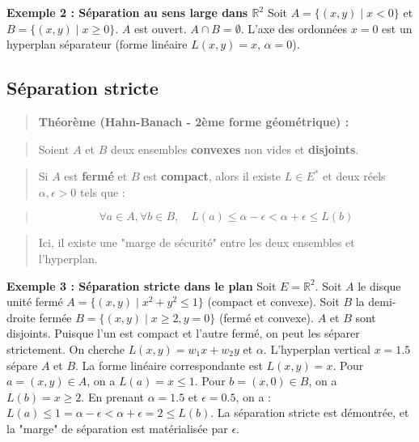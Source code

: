 \documentclass[11pt,a4paper]{article}
\begin{document}
\textbf{Exemple 2 : Séparation au sens large dans $\mathbb{R}^2$}
Soit $A = \{ (x,y) \mid x < 0 \}$ et $B = \{ (x,y) \mid x \ge 0 \}$. $A$ est ouvert. $A \cap B = \emptyset$. L'axe des ordonnées $x=0$ est un hyperplan séparateur (forme linéaire $L(x,y)=x$, $\alpha=0$).


\begin{center}
\end{center}


\subsection{Séparation stricte}

\begin{quote}\textbf{Théorème (Hahn-Banach - 2ème forme géométrique) :}\end{quote}
\begin{quote}Soient $A$ et $B$ deux ensembles \textbf{convexes} non vides et \textbf{disjoints}.\end{quote}
\begin{quote}Si $A$ est \textbf{fermé} et $B$ est \textbf{compact}, alors il existe $L \in E^*$ et deux réels $\alpha, \epsilon > 0$ tels que :\end{quote}
\begin{quote}$$\forall a \in A, \forall b \in B, \quad L(a) \le \alpha - \epsilon < \alpha + \epsilon \le L(b)$$\end{quote}
\begin{quote}Ici, il existe une "marge de sécurité" entre les deux ensembles et l'hyperplan.\end{quote}


\textbf{Exemple 3 : Séparation stricte dans le plan}
Soit $E=\mathbb{R}^2$. Soit $A$ le disque unité fermé $A = \{ (x,y) \mid x^2+y^2 \le 1 \}$ (compact et convexe).
Soit $B$ la demi-droite fermée $B = \{ (x,y) \mid x \ge 2, y=0 \}$ (fermé et convexe). $A$ et $B$ sont disjoints.
Puisque l'un est compact et l'autre fermé, on peut les séparer strictement.
On cherche $L(x,y) = w_1 x + w_2 y$ et $\alpha$.
L'hyperplan vertical $x = 1.5$ sépare $A$ et $B$.
La forme linéaire correspondante est $L(x,y) = x$.
Pour $a = (x,y) \in A$, on a $L(a) = x \le 1$.
Pour $b = (x,0) \in B$, on a $L(b) = x \ge 2$.
En prenant $\alpha = 1.5$ et $\epsilon = 0.5$, on a :
$L(a) \le 1 = \alpha - \epsilon < \alpha + \epsilon = 2 \le L(b)$.
La séparation stricte est démontrée, et la "marge" de séparation est matérialisée par $\epsilon$.
\end{document}
